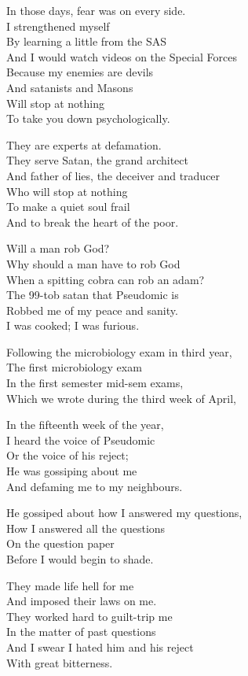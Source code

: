 \documentclass[
]{book}
\begin{document}
In those days, fear was on every side.\\
I strengthened myself\\
By learning a little from the SAS\\
And I would watch videos on the Special Forces\\
Because my enemies are devils\\
And satanists and Masons\\
Will stop at nothing\\
To take you down psychologically.

They are experts at defamation.\\
They serve Satan, the grand architect\\
And father of lies, the deceiver and traducer\\
Who will stop at nothing\\
To make a quiet soul frail\\
And to break the heart of the poor.

Will a man rob God?\\
Why should a man have to rob God\\
When a spitting cobra can rob an adam?\\
The 99-tob satan that Pseudomic is\\
Robbed me of my peace and sanity.\\
I was cooked; I was furious.

Following the microbiology exam in third year,\\
The first microbiology exam\\
In the first semester mid-sem exams,\\
Which we wrote during the third week of April,

In the fifteenth week of the year,\\
I heard the voice of Pseudomic\\
Or the voice of his reject;\\
He was gossiping about me\\
And defaming me to my neighbours.

He gossiped about how I answered my questions,\\
How I answered all the questions\\
On the question paper\\
Before I would begin to shade.

They made life hell for me\\
And imposed their laws on me.\\
They worked hard to guilt-trip me\\
In the matter of past questions\\
And I swear I hated him and his reject\\
With great bitterness.
\end{document}
